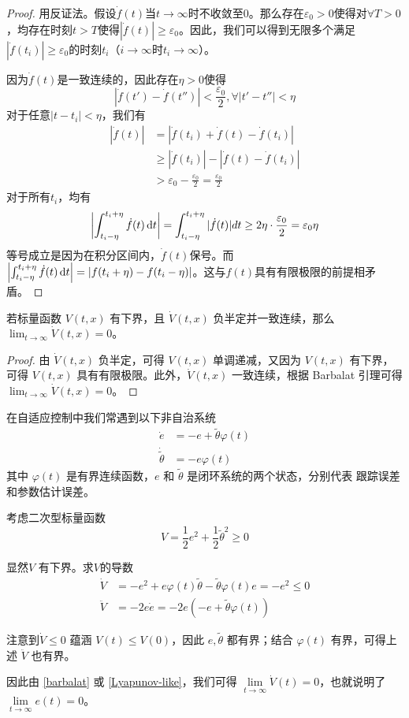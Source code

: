 \begin{proof}
  用反证法。假设$\dot{f}(t)$当$t\to\infty$时不收敛至$0$。那么存在$\varepsilon_0>0$使得对$\forall T>0$，均存在时刻$t>T$使得$|\dot{f}(t)|\ge \varepsilon_0$。因此，我们可以得到无限多个满足$|\dot{f}(t_i)|\ge \varepsilon_0$的时刻$t_i$（$i\to\infty$时$t_i\to\infty$）。

  因为$\dot{f}(t)$是一致连续的，因此存在$\eta>0$使得
  \[|\dot{f}(t')-\dot{f}(t'')|<\frac{\varepsilon_0}{2},\forall |t'-t''|<\eta\]
  对于任意$|t-t_i|<\eta$，我们有
  \begin{align*}
    |\dot{f}(t)|&= |\dot{f}(t_i)+\dot{f}(t)-\dot{f}(t_i)|\\
    &\ge |\dot{f}(t_i)|- |\dot{f}(t)-\dot{f}(t_i)|\\
    &>\varepsilon_0-\frac{\varepsilon_0}{2}=\frac{\varepsilon_0}{2}
  \end{align*}
  对于所有$t_i$，均有
  \[\left|\int_{t_i-\eta}^{t_i+\eta}\dot{f}(t)\mathop{}\!\mathrm{d} t\right|=\int_{t_i-\eta}^{t_i+\eta}|\dot{f}(t)|dt\geq2\eta\cdot\frac{\varepsilon_{0}}{2}=\varepsilon_{0}\eta\]
  等号成立是因为在积分区间内，$\dot{f}(t)$保号。而$\left|\int_{t_i-\eta}^{t_i+\eta}\dot{f}(t)\mathop{}\!\mathrm{d} t\right|=|f(t_i+\eta)-f(t_i-\eta)|$。这与$f(t)$具有有限极限的前提相矛盾。
\end{proof}
\begin{theorem}\label{Lyapunov-like}
  若标量函数 $V(t, x)$ 有下界，且 $\dot{V}(t, x)$ 负半定并一致连续，那么 $\lim_{t \to \infty} \dot{V}(t, x) = 0$。
\end{theorem}
\begin{proof}
  由 $\dot{V}(t, x)$ 负半定，可得 $V (t, x)$ 单调递减，又因为 $V(t, x)$ 有下界，可得 $V (t, x)$ 具有有限极限。此外，$\dot{V}(t, x)$ 一致连续，根据 Barbalat 引理可得 $\lim_{t \to \infty} \dot{V}(t, x) = 0$。
\end{proof}
\begin{example}
  在自适应控制中我们常遇到以下非自治系统
  \begin{align*}
    \dot{e} & = - e + \tilde{\theta} \varphi (t)\\
    \dot{\tilde{\theta}} & = - e \varphi (t)
  \end{align*}
  其中 $\varphi (t)$ 是有界连续函数，$e$ 和 $\tilde{\theta}$ 是闭环系统的两个状态，分别代表
  跟踪误差和参数估计误差。
  
  考虑二次型标量函数 \[V = \frac{1}{2} e^2 + \frac{1}{2} \tilde{\theta}^2 \geq 0\]
  
  显然$V$ 有下界。求$V$的导数
  \begin{align*}
    \dot{V} &= - e^2+e\varphi(t)\tilde{\theta}-\tilde{\theta}\varphi(t)e= - e^2 \leq 0 \\
    \ddot{V} &= - 2 e  \dot{e} = - 2 e (- e + \tilde{\theta} \varphi (t))
  \end{align*}
  
  注意到$\dot{V} \leq 0$ 蕴涵 $V (t) \leq V (0)$，因此 $e, \tilde{\theta}$ 都有界；结合  
   $\varphi (t)$ 有界，可得上述 $\ddot{V}$ 也有界。
  
  因此由 \ref{barbalat} 或 \ref{Lyapunov-like}，我们可得 $\lim\limits_{t \rightarrow\infty} \dot{V} (t) = 0$，也就说明了 $\lim\limits_{t \rightarrow \infty} e (t) = 0$。
\end{example}
